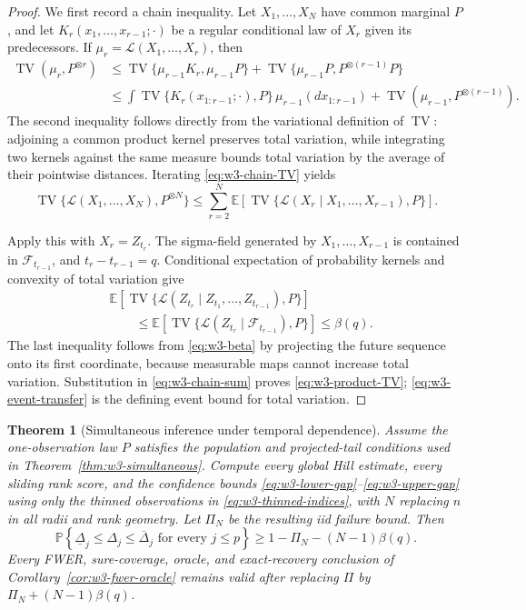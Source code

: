\documentclass[11pt]{article}
\newtheorem{theorem}{Theorem}[section]
\theoremstyle{remark}
\newcommand{\Pp}{\mathbb P}
\newcommand{\E}{\mathbb E}
\newcommand{\TV}{\operatorname{TV}}
\begin{document}
\begin{proof}
We first record a chain inequality.  Let $X_1,\ldots,X_N$ have common marginal
$P$, and let $K_r(x_1,\ldots,x_{r-1};\cdot)$ be a regular conditional law of
$X_r$ given its predecessors.  If $\mu_r=\mathcal L(X_1,\ldots,X_r)$, then
\begin{align}
 \TV(\mu_r,P^{\otimes r})
 &\le
 \TV\{\mu_{r-1}K_r,\mu_{r-1}P\}
 +\TV\{\mu_{r-1}P,P^{\otimes(r-1)}P\}\\
 &\le
 \int\TV\{K_r(x_{1:r-1};\cdot),P\}\,
       \mu_{r-1}(d x_{1:r-1})
 +\TV(\mu_{r-1},P^{\otimes(r-1)}).
 \label{eq:w3-chain-TV}
\end{align}
The second inequality follows directly from the variational definition of
$\TV$: adjoining a common product kernel preserves total variation, while
integrating two kernels against the same measure bounds total variation by the
average of their pointwise distances.  Iterating
\eqref{eq:w3-chain-TV} yields
\begin{equation}
 \TV\{\mathcal L(X_1,\ldots,X_N),P^{\otimes N}\}
 \le\sum_{r=2}^N
 \E\left[
  \TV\{\mathcal L(X_r\mid X_1,\ldots,X_{r-1}),P\}
 \right].
 \label{eq:w3-chain-sum}
\end{equation}

Apply this with $X_r=Z_{t_r}$.  The sigma-field generated by
$X_1,\ldots,X_{r-1}$ is contained in $\mathcal F_{t_{r-1}}$, and
$t_r-t_{r-1}=q$.  Conditional expectation of probability kernels and convexity
of total variation give
\begin{align*}
 &\E\left[
  \TV\{\mathcal L(Z_{t_r}\mid Z_{t_1},\ldots,Z_{t_{r-1}}),P\}
 \right]\\
 &\qquad\le
 \E\left[
  \TV\{\mathcal L(Z_{t_r}\mid\mathcal F_{t_{r-1}}),P\}
 \right]
 \le\beta(q).
\end{align*}
The last inequality follows from \eqref{eq:w3-beta} by projecting the future
sequence onto its first coordinate, because measurable maps cannot increase
total variation.  Substitution in \eqref{eq:w3-chain-sum} proves
\eqref{eq:w3-product-TV}; \eqref{eq:w3-event-transfer} is the defining event
bound for total variation.
\end{proof}

\begin{theorem}[Simultaneous inference under temporal dependence]
\label{thm:w3-beta-inference}
Assume the one-observation law $P$ satisfies the population and projected-tail
conditions used in Theorem~\ref{thm:w3-simultaneous}.  Compute every global
Hill estimate, every sliding rank score, and the confidence bounds
\eqref{eq:w3-lower-gap}--\eqref{eq:w3-upper-gap} using only the thinned
observations in \eqref{eq:w3-thinned-indices}, with $N$ replacing $n$ in all
radii and rank geometry.  Let $\Pi_N$ be the resulting iid failure bound.
Then
\begin{equation}
 \Pp\left\{
  \underline\Delta_j\le\Delta_j\le\overline\Delta_j
  \text{ for every }j\le p
 \right\}
 \ge1-\Pi_N-(N-1)\beta(q).
 \label{eq:w3-beta-coverage}
\end{equation}
Every FWER, sure-coverage, oracle, and exact-recovery conclusion of
Corollary~\ref{cor:w3-fwer-oracle} remains valid after replacing $\Pi$ by
$\Pi_N+(N-1)\beta(q)$.
\end{theorem}
\end{document}
